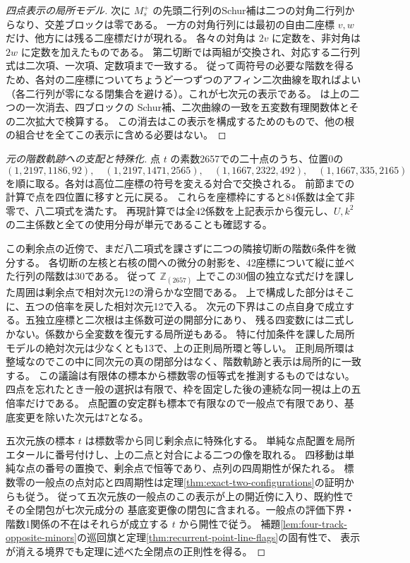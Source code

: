 \begin{proof}[四点表示の局所モデル]
次に $M_s^+$ の先頭二行列のSchur補は二つの対角二行列からなり、交差ブロックは零である。
一方の対角行列には最初の自由二座標 $v,w$ だけ、他方には残る二座標だけが現れる。
各々の対角は $2v$ に定数を、非対角は $2w$ に定数を加えたものである。
第二切断では両組が交換され、対応する二行列式は二次項、一次項、定数項まで一致する。
従って両符号の必要な階数を得るため、各対の二座標についてちょうど一つずつのアフィン二次曲線を取ればよい
（各二行列が零になる閉集合を避ける）。これが七次元の表示である。
は上の二つの一次消去、四ブロックの
Schur補、二次曲線の一致を五変数有理関数体とその二次拡大で検算する。
この消去はこの表示を構成するためのもので、他の根の組合せを全てこの表示に含める必要はない。
\end{proof}

\begin{proof}[元の階数軌跡への支配と特殊化]
点 $t$ の素数2657での二十点のうち、位置0の
\[
 (1,2197,1186,92),\quad(1,2197,1471,2565),\quad
 (1,1667,2322,492),\quad(1,1667,335,2165)
\]
を順に取る。各対は高位二座標の符号を変える対合で交換される。
前節までの計算で点を四位置に移すと元に戻る。
これらを座標枠にすると84係数は全て非零で、八二項式を満たす。
再現計算では全42係数を上記表示から復元し、$U,k^2$ の二主係数と全ての使用分母が単元であることも確認する。

この剰余点の近傍で、まだ八二項式を課さずに二つの隣接切断の階数6条件を微分する。
各切断の左核と右核の間への微分の射影を、42座標について縦に並べた行列の階数は30である。
従って $\mathbb Z_{(2657)}$ 上でこの30個の独立な式だけを課した周囲は剰余点で相対次元12の滑らかな空間である。
上で構成した部分はそこに、五つの倍率を戻した相対次元12で入る。
次元の下界はこの点自身で成立する。五独立座標と二次根は主係数可逆の開部分にあり、
残る四変数には二式しかない。係数から全変数を復元する局所逆もある。
特に付加条件を課した局所モデルの絶対次元は少なくとも13で、上の正則局所環と等しい。
正則局所環は整域なのでこの中に同次元の真の閉部分はなく、階数軌跡と表示は局所的に一致する。
この議論は有限体の標本から標数零の恒等式を推測するものではない。
四点を忘れたとき一般の選択は有限で、枠を固定した後の連続な同一視は上の五倍率だけである。
点配置の安定群も標本で有限なので一般点で有限であり、基底変更を除いた次元は7となる。

五次元族の標本 $t$ は標数零から同じ剰余点に特殊化する。
単純な点配置を局所エタールに番号付けし、上の二点と対合による二つの像を取れる。
四移動は単純な点の番号の置換で、剰余点で恒等であり、点列の四周期性が保たれる。
標数零の一般点の点対応と四周期性は定理\ref{thm:exact-two-configurations}の証明からも従う。
従って五次元族の一般点のこの表示が上の開近傍に入り、既約性でその全閉包が七次元成分の
基底変更像の閉包に含まれる。一般点の評価下界・階数1関係の不在はそれらが成立する $t$ から開性で従う。
補題\ref{lem:four-track-opposite-minors}の巡回旗と定理\ref{thm:recurrent-point-line-flags}の固有性で、
表示が消える境界でも定理に述べた全閉点の正則性を得る。
\end{proof}

